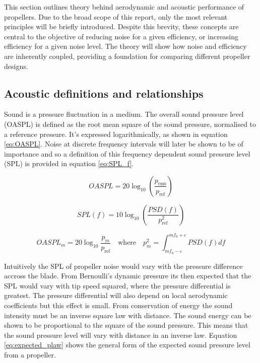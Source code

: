 \documentclass[12pt,a4paper]{article}
\begin{document}
This section outlines theory behind aerodynamic and acoustic performance of propellers.
Due to the broad scope of this report, only the most relevant principles will be briefly introduced.
Despite this brevity, these concepts are central to the objective of reducing noise for a given efficiency, or increasing efficiency for a given noise level.
The theory will show how noise and efficiency are inherently coupled, providing a foundation for comparing different propeller designs.

\subsection{Acoustic definitions and relationships}
Sound is a pressure fluctuation in a medium.
The overall sound pressure level (OASPL) is defined as the root mean square of the sound pressure, normalised to a reference pressure.
It's expressed logarithmically, as shown in equation \ref{eq:OASPL}.
Noise at discrete frequency intervals will later be shown to be of importance and so a definition of this frequency dependent sound pressure level (SPL) is provided in equation \ref{eq:SPL_f}.

\begin{equation}
    OASPL = 20 \log_{10} \left( \frac{p_\text{rms}}{p_\text{ref}} \right) \label{eq:OASPL}
\end{equation}

\begin{equation}
    SPL(f) = 10 \log_{10} \left( \frac{PSD(f)}{p^2_\text{ref}} \right) \label{eq:SPL_f}
\end{equation}

\begin{equation}
    OASPL_m = 20 \log_{10} \frac{ p_m }{p_\text{ref}} \label{eq:OASPLm} \quad \text{where} \quad p_m^2 = \int^{m f_0 + \varepsilon}_{m f_0 - \varepsilon} PSD(f) df
\end{equation}

Intuitively the SPL of propeller noise would vary with the pressure difference accross the blade.
From Bernoulli's dynamic pressure its then expected that the SPL would vary with tip speed squared, where the pressure differential is greatest.
The pressure differential will also depend on local aerodynamic coefficients but this effect is small.
From conservation of energy the sound intensity must be an inverse square law with distance.
The sound energy can be shown to be proportional to the square of the sound pressure.
This means that the sound pressure level will vary with distance in an inverse law.
Equation \ref{eq:expected_plaw} shows the general form of the expected sound pressure level from a propeller.
\end{document}
